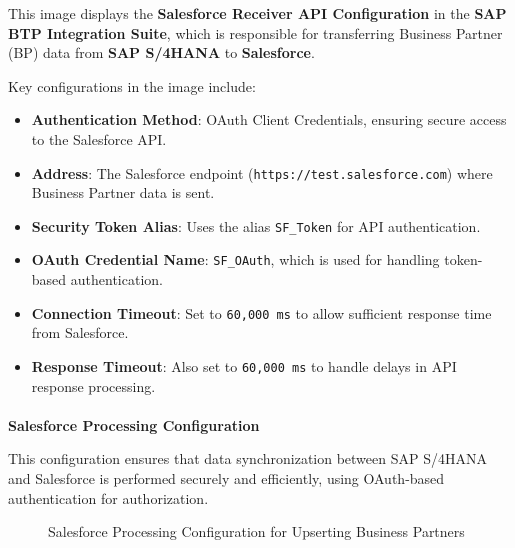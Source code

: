 \noindent This image displays the \textbf{Salesforce Receiver API Configuration} in the \textbf{SAP BTP Integration Suite}, which is responsible for transferring Business Partner (BP) data from \textbf{SAP S/4HANA} to \textbf{Salesforce}.

Key configurations in the image include:
\begin{itemize}
    \item \textbf{Authentication Method}: OAuth Client Credentials, ensuring secure access to the Salesforce API.
    \item \textbf{Address}: The Salesforce endpoint (\texttt{https://test.salesforce.com}) where Business Partner data is sent.
    \item \textbf{Security Token Alias}: Uses the alias \texttt{SF\_Token} for API authentication.
    \item \textbf{OAuth Credential Name}: \texttt{SF\_OAuth}, which is used for handling token-based authentication.
    \item \textbf{Connection Timeout}: Set to \texttt{60,000 ms} to allow sufficient response time from Salesforce.
    \item \textbf{Response Timeout}: Also set to \texttt{60,000 ms} to handle delays in API response processing.
\end{itemize}


\paragraph{}
\textbf{Salesforce Processing Configuration}

This configuration ensures that data synchronization between SAP S/4HANA and Salesforce is performed securely and efficiently, using OAuth-based authentication for authorization.

\begin{figure}[h]
    \centering
    \caption{Salesforce Processing Configuration for Upserting Business Partners}
    \label{fig:sf_processing}
\end{figure}

